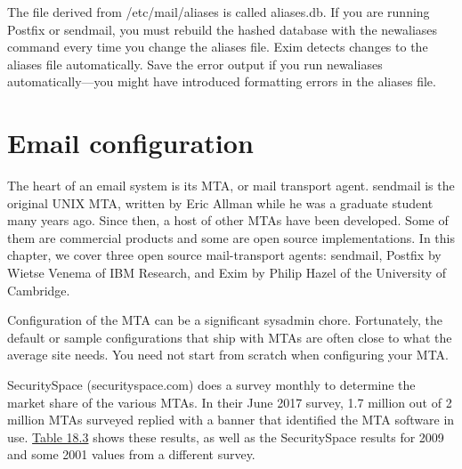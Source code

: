 \protect\hypertarget{part0026_split_022.htmlux5cux23_idTextAnchor1036}{}{}The
file derived
fro\protect\hypertarget{part0026_split_022.htmlux5cux23_idTextAnchor1037}{}{}m
{/etc/mail/aliases} is called {aliases.db}. If you are running Postfix
or {sendmail}, you must rebuild the hashed database with the
\protect\hypertarget{part0026_split_022.htmlux5cux23_idIndexMarker2481}{}{}{newaliases}
command every time you change the {aliases} file. Exim detects changes
to the {aliases }file automatically. Save the error output if you run
{newaliases} automatically---you might have introduced formatting errors
in the {aliases} file.



\section{Email configuration}

{\protect\hypertarget{part0026_split_023.htmlux5cux23_idIndexMarker2482}{}{}}\protect\hypertarget{part0026_split_023.htmlux5cux23_idTextAnchor1040}{}{}The
heart of an email system is its MTA, or mail transport agent.
\protect\hypertarget{part0026_split_023.htmlux5cux23_idIndexMarker2483}{}{}{sendmail}
is the original UNIX MTA, written by
\protect\hypertarget{part0026_split_023.htmlux5cux23_idIndexMarker2484}{}{}Eric
Allman while he was a graduate student many years ago. Since then, a
host of other MTAs have been developed. Some of them are commercial
products and some are open source implementations. In this chapter, we
cover three open source mail-transport agents: {sendmail},
\protect\hypertarget{part0026_split_023.htmlux5cux23_idIndexMarker2485}{}{}Postfix
by
\protect\hypertarget{part0026_split_023.htmlux5cux23_idIndexMarker2486}{}{}Wietse
Venema of
\protect\hypertarget{part0026_split_023.htmlux5cux23_idIndexMarker2487}{}{}IBM
Research, and
\protect\hypertarget{part0026_split_023.htmlux5cux23_idIndexMarker2488}{}{}Exim
by
\protect\hypertarget{part0026_split_023.htmlux5cux23_idIndexMarker2489}{}{}Philip
Hazel of the
\protect\hypertarget{part0026_split_023.htmlux5cux23_idIndexMarker2490}{}{}University
of Cambridge.

Configuration of the MTA can be a significant sysadmin chore.
Fortunately, the default or sample configurations that ship with MTAs
are often close to what the average site needs. You need not start from
scratch when configuring your MTA.

\protect\hypertarget{part0026_split_023.htmlux5cux23_idIndexMarker2491}{}{}SecuritySpace
(securityspace.com) does a survey monthly to determine the market share
of the various MTAs. In their June 2017 survey, 1.7 million out of 2
million MTAs surveyed replied with a banner that identified the MTA
software in use.
\protect\hyperlink{part0026_split_023.htmlux5cux23_idTextAnchor1041}{Table
18.3} shows these results, as well as the SecuritySpace results for 2009
and some 2001 values from a different survey.

